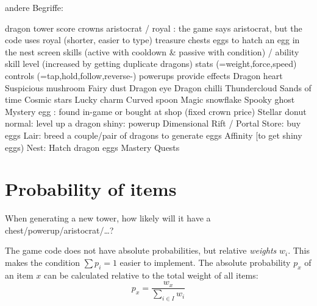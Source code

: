 \documentclass[parskip=half]{scrartcl}
\begin{document}
andere Begriffe:

dragon
tower
score
crowns
aristocrat / royal : the game says aristocrat, but the code uses royal (shorter, easier to type)
treasure chests
eggs
to hatch an egg in the nest screen
skills (active with cooldown \& passive with condition) / ability
skill level (increased by getting duplicate dragons)
stats (=weight,force,speed)
controls (=tap,hold,follow,reverse-)
powerups provide effects
  Dragon heart
  Suspicious mushroom
  Fairy dust
  Dragon eye
  Dragon chilli
  Thundercloud
  Sands of time
  Cosmic stars
  Lucky charm
  Curved spoon
  Magic snowflake
  Spooky ghost
Mystery egg : found in-game or bought at shop (fixed crown price)
Stellar donut
  normal: level up a dragon
  shiny:
  powerup
Dimensional Rift / Portal
Store: buy eggs
Lair: breed a couple/pair of dragons to generate eggs
Affinity [to get shiny eggs)
Nest: Hatch dragon eggs
Mastery
Quests


\section{Probability of items}
When generating a new tower, how likely will it have a chest/powerup/aristocrat/…?

The game code does not have absolute probabilities, but relative \emph{weights} $w_i$.
This makes the condition $\sum p_i = 1$ easier to implement.
The absolute probability $p_x$ of an item $x$ can be calculated relative to the total weight of all items:
\[ p_x = \frac{w_x}{\sum_{i \in I} w_i} \]
\end{document}
